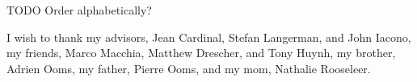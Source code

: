 
TODO Order alphabetically?

I wish to thank
my advisors, Jean Cardinal, Stefan Langerman, and John Iacono,
my friends, Marco Macchia, Matthew Drescher, and Tony Huynh,
my brother, Adrien Ooms,
my father, Pierre Ooms,
and my mom, Nathalie Rooseleer.
